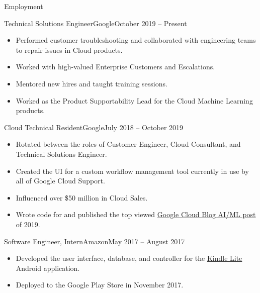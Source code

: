 \documentclass[]{mcdowellcv}
\begin{document}
    \makeheader
    
    \begin{cvsection}{Employment}
    
        \begin{cvsubsection}{Technical Solutions Engineer}{Google}{October 2019 -- Present}
            \begin{itemize}
            \item Performed customer troubleshooting and collaborated with engineering teams to repair issues in Cloud products.
            \item Worked with high-valued Enterprise Customers and Escalations.
            \item Mentored new hires and taught training sessions.
            \item Worked as the Product Supportability Lead for the Cloud Machine Learning products.
            \end{itemize}
        \end{cvsubsection}

        \begin{cvsubsection}{Cloud Technical Resident}{Google}{July 2018 -- October 2019}
            \begin{itemize}
            \item Rotated between the roles of Customer Engineer, Cloud Consultant, and Technical Solutions Engineer.
            \item Created the UI for a custom workflow management tool currently in use by all of Google Cloud Support.
            \item Influenced over \$50 million in Cloud Sales.
            \item Wrote code for and published the top viewed
            \href{https://cloud.google.com/blog/products/ai-machine-learning/building-a-document-understanding-pipeline-with-google-cloud}{Google Cloud Blog AI/ML post} of 2019.
            \end{itemize}
        \end{cvsubsection}

        \begin{cvsubsection}{Software Engineer, Intern}{Amazon}{May 2017 -- August 2017}
            \begin{itemize}
            \item Developed the user interface, database, and controller for the \href{https://play.google.com/store/apps/details?id=com.amazon.klite&hl=en}{Kindle Lite} Android application.
            \item Deployed to the Google Play Store in November 2017.
            \end{itemize}
        \end{cvsubsection}


\end{cvsection}
\end{document}

